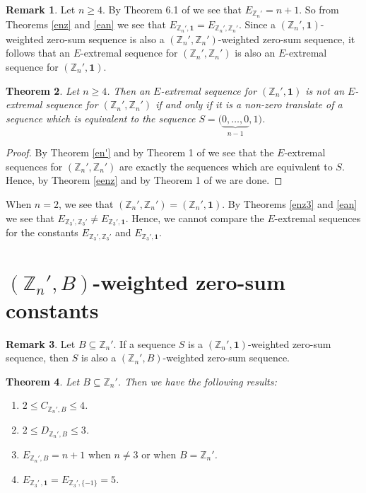 \documentclass{article}[11pt]
\newtheorem{theorem}{Theorem}[section]
\theoremstyle{definition}
\newtheorem{remark}[theorem]{Remark}
\begin{document}
\begin{remark}\label{comp}
Let $n\geq 4$. By Theorem 6.1 of \cite{ACFKP} we see that $E_{\mathbb Z_n'}=n+1$. So from Theorems \ref{enz} and \ref{ean} we see that $E_{\mathbb Z_n',\mathbf 1}=E_{\mathbb Z_n',\mathbb Z_n'}$. Since a $(\mathbb Z_n',\mathbf 1)$-weighted zero-sum sequence is also a $(\mathbb Z_n',\mathbb Z_n')$-weighted zero-sum sequence, it follows that an $E$-extremal sequence for $(\mathbb Z_n',\mathbb Z_n')$ is also an $E$-extremal sequence for $(\mathbb Z_n',\mathbf 1)$.
\end{remark}

\begin{theorem}
Let $n\geq 4$. Then an $E$-extremal sequence for $(\mathbb Z_n',\mathbf 1)$ is not an $E$-extremal sequence for $(\mathbb Z_n',\mathbb Z_n')$ if and only if it is a non-zero translate of a sequence which is equivalent to the sequence $S=\big(\underbrace{0,\ldots,0}_\text{$n-1$},1\big)$.
\end{theorem}

\begin{proof}
By Theorem \ref{en'} and by Theorem 1 of \cite{AMP} we see that the $E$-extremal sequences for $(\mathbb Z_n',\mathbb Z_n')$ are exactly the sequences which are equivalent to $S$. Hence, by Theorem \ref{eenz} and by Theorem 1 of \cite{AMP} we are done.
\end{proof}

When $n=2$, we see that $(\mathbb Z_n',\mathbb Z_n')=(\mathbb Z_n',\mathbf 1)$. By Theorems \ref{enz3} and \ref{ean} we see that $E_{\mathbb Z_3',\mathbb Z_3'}\neq E_{\mathbb Z_3',\mathbf 1}$. Hence, we cannot compare the $E$-extremal sequences for the constants $E_{\mathbb Z_3',\mathbb Z_3'}$ and $E_{\mathbb Z_3',\mathbf 1}$.



\section{$(\mathbb Z_n',B)$-weighted zero-sum constants}\label{b}

\begin{remark}\label{ub}
Let $B\subseteq\mathbb Z_n'$. If a sequence $S$ is a $(\mathbb Z_n',\mathbf 1)$-weighted zero-sum sequence, then $S$ is also a $(\mathbb Z_n',B)$-weighted zero-sum sequence.
\end{remark}

\begin{theorem}\label{bg}
Let $B\subseteq \mathbb Z_n'$. Then we have the following results:
\begin{enumerate}[label=(\arabic*),ref=(\arabic*)]
\item[$(a)$] $2\leq C_{\mathbb Z_n',B}\leq 4$.
\item[$(b)$] $2\leq D_{\mathbb Z_n',B}\leq 3$.
\item[$(c)$] $E_{\mathbb Z_n',B}=n+1\mbox{ when }n\neq 3\mbox{ or when }B=\mathbb Z_n'$.
\item[$(d)$] $E_{\mathbb Z_3'\,,\mathbf 1}=E_{\mathbb Z_3',\{-1\}}=5$.
\end{enumerate}
\end{theorem}
\end{document}
